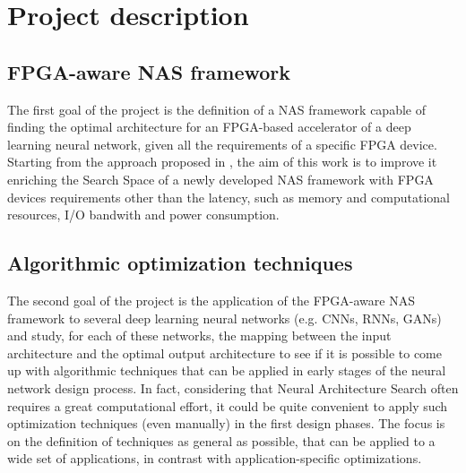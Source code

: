 \documentclass[11pt,a4paper]{article}
\begin{document}
\section{Project description}
\subsection{FPGA-aware NAS framework}
The first goal of the project is the definition of a NAS framework capable of finding the optimal architecture for an FPGA-based accelerator of a deep learning neural network, given all the requirements of a specific FPGA device. Starting from the approach proposed in \cite{jiang_nas_fpga_2019}, the aim of this work is to improve it enriching the Search Space of a newly developed NAS framework with FPGA devices requirements other than the latency, such as memory and computational resources, I/O bandwith and power consumption.
\subsection{Algorithmic optimization techniques}
The second goal of the project is the application of the FPGA-aware NAS framework to several deep learning neural networks (e.g. CNNs, RNNs, GANs) and study, for each of these networks, the mapping between the input architecture and the optimal output architecture to see if it is possible to come up with algorithmic techniques that can be applied in early stages of the neural network design process. In fact, considering that Neural Architecture Search often requires a great computational effort, it could be quite convenient to apply such optimization techniques (even manually) in the first design phases. The focus is on the definition of techniques as general as possible, that can be applied to a wide set of applications, in contrast with application-specific optimizations.
\end{document}
